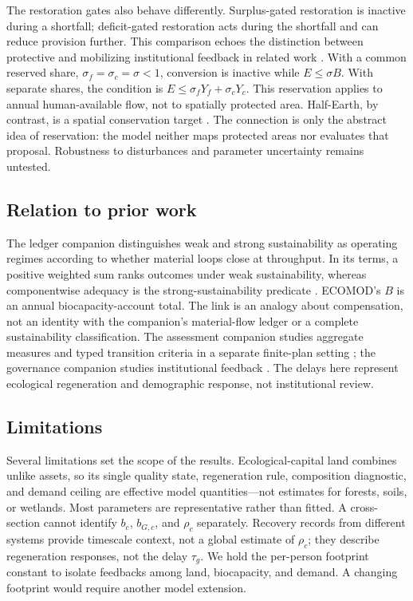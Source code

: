 \documentclass[preprint,12pt,authoryear]{elsarticle}
\begin{document}
The restoration gates also behave differently. Surplus-gated restoration is inactive during a shortfall; deficit-gated restoration acts during the shortfall and can reduce provision further. This comparison echoes the distinction between protective and mobilizing institutional feedback in related work \citep{Abaee2026a}. With a common reserved share, $\sigma_f=\sigma_c=\sigma<1$, conversion is inactive while $E\le\sigma B$. With separate shares, the condition is $E\le\sigma_fY_f+\sigma_cY_c$. This reservation applies to annual human-available flow, not to spatially protected area. Half-Earth, by contrast, is a spatial conservation target \citep{Wilson2016}. The connection is only the abstract idea of reservation: the model neither maps protected areas nor evaluates that proposal. Robustness to disturbances and parameter uncertainty remains untested.

\subsection{Relation to prior work}

The ledger companion distinguishes weak and strong sustainability as operating regimes according to whether material loops close at throughput. In its terms, a positive weighted sum ranks outcomes under weak sustainability, whereas componentwise adequacy is the strong-sustainability predicate \citep[Sections~1.1 and 10.1]{Abaee2026c}. ECOMOD's $B$ is an annual biocapacity-account total. The link is an analogy about compensation, not an identity with the companion's material-flow ledger or a complete sustainability classification. The assessment companion studies aggregate measures and typed transition criteria in a separate finite-plan setting \citep{Abaee2026b}; the governance companion studies institutional feedback \citep{Abaee2026a}. The delays here represent ecological regeneration and demographic response, not institutional review.

\subsection{Limitations}

Several limitations set the scope of the results. Ecological-capital land combines unlike assets, so its single quality state, regeneration rule, composition diagnostic, and demand ceiling are effective model quantities—not estimates for forests, soils, or wetlands. Most parameters are representative rather than fitted. A cross-section cannot identify $b_c$, $b_{G,c}$, and $\rho_c$ separately. Recovery records from different systems provide timescale context, not a global estimate of $\rho_c$; they describe regeneration responses, not the delay $\tau_g$. We hold the per-person footprint constant to isolate feedbacks among land, biocapacity, and demand. A changing footprint would require another model extension.
\end{document}
